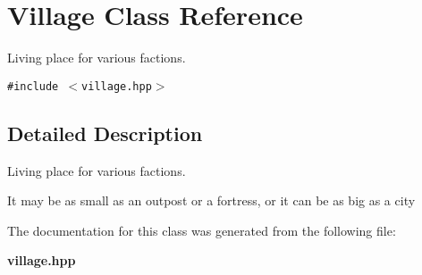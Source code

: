 \section{Village Class Reference}
\label{classVillage}
Living place for various factions.  


{\tt \#include $<$village.hpp$>$}



\subsection{Detailed Description}
Living place for various factions. 

It may be as small as an outpost or a fortress, or it can be as big as a city



The documentation for this class was generated from the following file:\begin{CompactItemize}
\item 
{\bf village.hpp}\end{CompactItemize}

